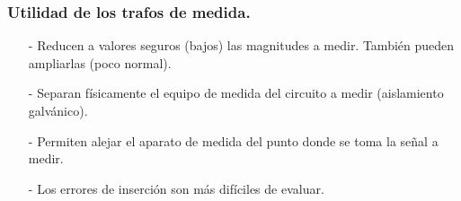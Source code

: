 		\subsubsection{Utilidad de los trafos de medida.}
			\begin{itemize}
				\item[-] Reducen a valores seguros (bajos) las magnitudes a medir. También pueden ampliarlas (poco normal).
				\item[-] Separan físicamente el equipo de medida del circuito a medir (aislamiento galvánico).
				\item[-] Permiten alejar el aparato de medida del punto donde se toma la señal a medir.
				\item[-] Los errores de inserción son más difíciles de evaluar.
			\end{itemize}
			
